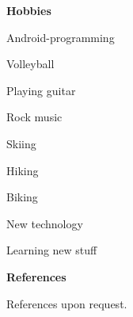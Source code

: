 \documentclass[a4paper,12pt,final]{memoir}
\newcommand{\Sep}{\vspace{1.5em}}
\newcommand{\SmallSep}{\vspace{0.5em}}
\newcommand{\CVSection}[1]
	{\Large\textbf{#1}\par
	\SmallSep\normalsize\normalfont}
\begin{document}
\CVSection{Hobbies}
\begin{compactitem}[\color{MidnightBlue}$\circ$]
	\item Android-programming
	\item Volleyball
	\item Playing guitar 
	\item Rock music
	\item Skiing
	\item Hiking
	\item Biking
	\item New technology
	\item Learning new stuff
\end{compactitem}
\Sep

\CVSection{References}
References upon request.

\end{document}
